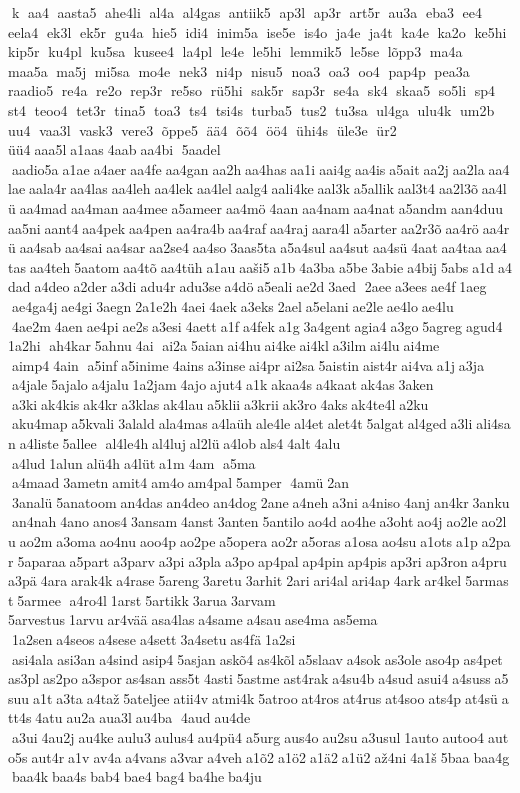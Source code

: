 k  aa4  aasta5  ahe4li  al4a  al4gas  antiik5  ap3l  ap3r  art5r  au3a  eba3  ee4  eela4  ek3l  ek5r  gu4a  hie5  idi4  inim5a  ise5e  is4o  ja4e  ja4t  ka4e  ka2o  ke5hi  kip5r  ku4pl  ku5sa  kusee4  la4pl  le4e  le5hi  lemmik5  le5se  lõpp3  ma4a  maa5a  ma5j  mi5sa  mo4e  nek3  ni4p  nisu5  noa3  oa3  oo4  pap4p  pea3a  raadio5  re4a  re2o  rep3r  re5so  rü5hi  sak5r  sap3r  se4a  sk4  skaa5  so5li  sp4  st4  teoo4  tet3r  tina5  toa3  ts4  tsi4s  turba5  tus2  tu3sa  ul4ga  ulu4k  um2b  uu4  vaa3l  vask3  vere3  õppe5  ää4  õõ4  öö4  ühi4s  üle3e  ür2  üü4 aaa5l a1aas 4aab aa4bi  5aadel  aadio5a a1ae a4aer aa4fe aa4gan aa2h aa4has aa1i aai4g aa4is a5ait aa2j aa2la aa4lae aala4r aa4las aa4leh aa4lek aa4lel aalg4 aali4ke aal3k a5allik aal3t4 aa2l3õ aa4lü aa4mad aa4man aa4mee a5ameer aa4mö 4aan aa4nam aa4nat a5andm aan4duu aa5ni aant4 aa4pek aa4pen aa4ra4b aa4raf aa4raj aara4l a5arter aa2r3õ aa4rö aa4rü aa4sab aa4sai aa4sar aa2se4 aa4so 3aas5ta a5a4sul aa4sut aa4sü 4aat aa4taa aa4tas aa4teh 5aatom aa4tõ aa4tüh a1au aaši5 a1b 4a3ba a5be 3abie a4bij 5abs a1d a4dad a4deo a2der a3di adu4r adu3se a4dö a5eali ae2d 3aed  2aee a3ees ae4f 1aeg  ae4ga4j ae4gi 3aegn 2a1e2h 4aei 4aek a3eks 2ael a5elani ae2le ae4lo ae4lu  4ae2m 4aen ae4pi ae2s a3esi 4aett a1f a4fek a1g 3a4gent agia4 a3go 5agreg agud4 1a2hi  ah4kar 5ahnu 4ai  ai2a 5aian ai4hu ai4ke ai4kl a3ilm ai4lu ai4me  aimp4 4ain  a5inf a5inime 4ains a3inse ai4pr ai2sa 5aistin aist4r ai4va a1j a3ja  a4jale 5ajalo a4jalu 1a2jam 4ajo ajut4 a1k akaa4s a4kaat ak4as 3aken  a3ki ak4kis ak4kr a3klas ak4lau a5klii a3krii ak3ro 4aks ak4te4l a2ku  aku4map a5kvali 3alald ala4mas a4laüh ale4le al4et alet4t 5algat al4ged a3li ali4san a4liste 5allee  al4le4h al4luj al2lü a4lob als4 4alt 4alu  a4lud 1alun alü4h a4lüt a1m 4am  a5ma  a4maad 3ametn amit4 am4o am4pal 5amper  4amü 2an  3analü 5anatoom an4das an4deo an4dog 2ane a4neh a3ni a4niso 4anj an4kr 3anku an4nah 4ano anos4 3ansam 4anst 3anten 5antilo ao4d ao4he a3oht ao4j ao2le ao2lu ao2m a3oma ao4nu aoo4p ao2pe a5opera ao2r a5oras a1osa ao4su a1ots a1p a2par 5aparaa a5part a3parv a3pi a3pla a3po ap4pal ap4pin ap4pis ap3ri ap3ron a4pru a3pä 4ara arak4k a4rase 5areng 3aretu 3arhit 2ari ari4al ari4ap 4ark ar4kel 5armast 5armee  a4ro4l 1arst 5artikk 3arua 3arvam 	5arvestus 1arvu ar4vää asa4las a4same a4sau ase4ma as5ema  1a2sen a4seos a4sese a4sett 3a4setu as4fä 1a2si  asi4ala asi3an a4sind asip4 5asjan askõ4 as4kõl a5slaav a4sok as3ole aso4p as4pet as3pl as2po a3spor as4san ass5t 4asti 5astme ast4rak a4su4b a4sud asui4 a4suss a5suu a1t a3ta a4taž 5ateljee atii4v atmi4k 5atroo at4ros at4rus at4soo ats4p at4sü att4s 4atu au2a aua3l au4ba  4aud au4de  a3ui 4au2j au4ke aulu3 aulus4 au4pü4 a5urg aus4o au2su a3usul 1auto autoo4 auto5s aut4r a1v av4a a4vans a3var a4veh a1õ2 a1ö2 a1ä2 a1ü2 až4ni 4a1š 5baa baa4g baa4k baa4s bab4 bae4 bag4 ba4he ba4ju 